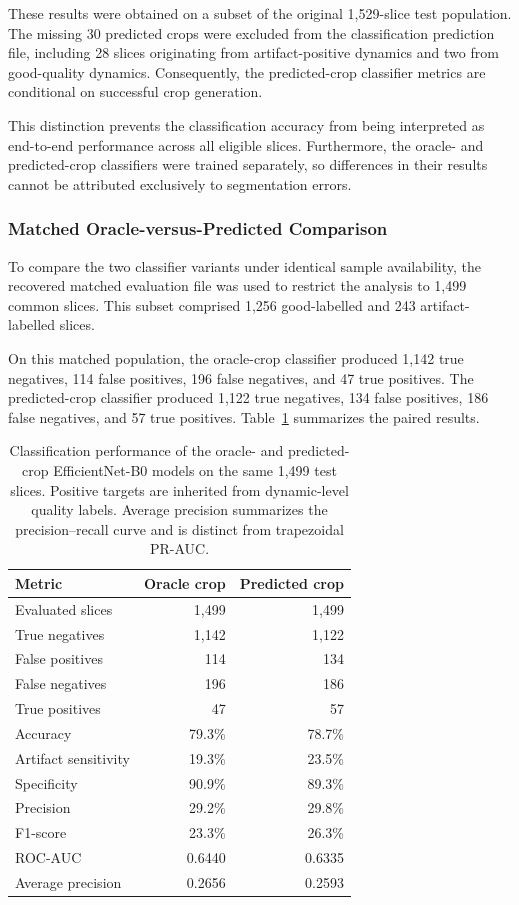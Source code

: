 These results were obtained on a subset of the original 1,529-slice test population. The missing 30 predicted crops were excluded from the classification prediction file, including 28 slices originating from artifact-positive dynamics and two from good-quality dynamics. Consequently, the predicted-crop classifier metrics are conditional on successful crop generation.

This distinction prevents the classification accuracy from being interpreted as end-to-end performance across all eligible slices. Furthermore, the oracle- and predicted-crop classifiers were trained separately, so differences in their results cannot be attributed exclusively to segmentation errors.

\subsubsection{Matched Oracle-versus-Predicted Comparison}
\label{subsec:results_matched_crops}

To compare the two classifier variants under identical sample availability, the recovered matched evaluation file was used to restrict the analysis to 1,499 common slices. This subset comprised 1,256 good-labelled and 243 artifact-labelled slices.

On this matched population, the oracle-crop classifier produced 1,142 true negatives, 114 false positives, 196 false negatives, and 47 true positives. The predicted-crop classifier produced 1,122 true negatives, 134 false positives, 186 false negatives, and 57 true positives. Table~\ref{tab:results_matched_oracle_predicted} summarizes the paired results.

\begin{table}[htbp]
\centering
\caption{Classification performance of the oracle- and predicted-crop EfficientNet-B0 models on the same 1,499 test slices. Positive targets are inherited from dynamic-level quality labels. Average precision summarizes the precision--recall curve and is distinct from trapezoidal PR-AUC.}
\label{tab:results_matched_oracle_predicted}
\begin{tabular}{lrr}
\hline
Metric & Oracle crop & Predicted crop \\
\hline
Evaluated slices & 1,499 & 1,499 \\
True negatives & 1,142 & 1,122 \\
False positives & 114 & 134 \\
False negatives & 196 & 186 \\
True positives & 47 & 57 \\
Accuracy & 79.3\% & 78.7\% \\
Artifact sensitivity & 19.3\% & 23.5\% \\
Specificity & 90.9\% & 89.3\% \\
Precision & 29.2\% & 29.8\% \\
F1-score & 23.3\% & 26.3\% \\
ROC-AUC & 0.6440 & 0.6335 \\
Average precision & 0.2656 & 0.2593 \\
\hline
\end{tabular}
\end{table}

